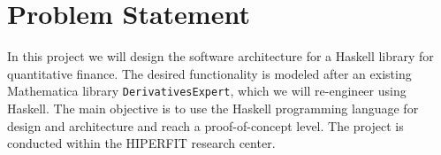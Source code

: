 \documentclass[11pt]{article}
\begin{document}
\section*{Problem Statement}

In this project we will design the software architecture for a Haskell library for quantitative finance.
The desired functionality is modeled after an existing Mathematica library {\tt DerivativesExpert}, which
we will re-engineer using Haskell.
The main objective is to use the Haskell programming language for design and architecture and reach a proof-of-concept level.
The project is conducted within the HIPERFIT research center.

\end{document}
